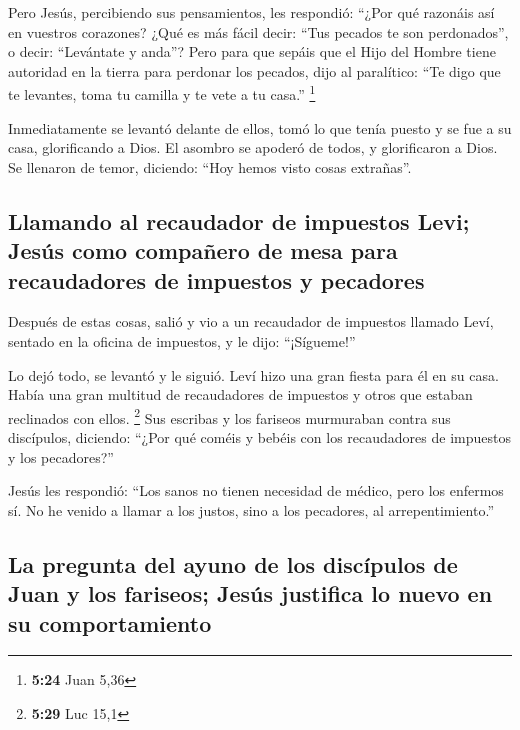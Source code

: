 \begin{paracol}{2}
 Pero Jesús, percibiendo sus pensamientos, les respondió:
``¿Por qué razonáis así en vuestros corazones?  ¿Qué es
más fácil decir: ``Tus pecados te son perdonados'', o decir: ``Levántate
y anda''?  Pero para que sepáis que el Hijo del Hombre
tiene autoridad en la tierra para perdonar los pecados, dijo al
paralítico: ``Te digo que te levantes, toma tu camilla y te vete a tu
casa.'' \footnote{\textbf{5:24} Juan 5,36}

 Inmediatamente se levantó delante de ellos, tomó lo que
tenía puesto y se fue a su casa, glorificando a Dios.  El
asombro se apoderó de todos, y glorificaron a Dios. Se llenaron de
temor, diciendo: ``Hoy hemos visto cosas extrañas''.

\hypertarget{llamando-al-recaudador-de-impuestos-levi-jesuxfas-como-compauxf1ero-de-mesa-para-recaudadores-de-impuestos-y-pecadores}{%
\subsection{Llamando al recaudador de impuestos Levi; Jesús como
compañero de mesa para recaudadores de impuestos y
pecadores}\label{llamando-al-recaudador-de-impuestos-levi-jesuxfas-como-compauxf1ero-de-mesa-para-recaudadores-de-impuestos-y-pecadores}}

 Después de estas cosas, salió y vio a un recaudador de
impuestos llamado Leví, sentado en la oficina de impuestos, y le dijo:
``¡Sígueme!''

 Lo dejó todo, se levantó y le siguió. 
Leví hizo una gran fiesta para él en su casa. Había una gran multitud de
recaudadores de impuestos y otros que estaban reclinados con ellos.
\footnote{\textbf{5:29} Luc 15,1}  Sus escribas y los
fariseos murmuraban contra sus discípulos, diciendo: ``¿Por qué coméis y
bebéis con los recaudadores de impuestos y los pecadores?''

 Jesús les respondió: ``Los sanos no tienen necesidad de
médico, pero los enfermos sí.  No he venido a llamar a
los justos, sino a los pecadores, al arrepentimiento.''

\hypertarget{la-pregunta-del-ayuno-de-los-discuxedpulos-de-juan-y-los-fariseos-jesuxfas-justifica-lo-nuevo-en-su-comportamiento}{%
\subsection{La pregunta del ayuno de los discípulos de Juan y los
fariseos; Jesús justifica lo nuevo en su
comportamiento}\label{la-pregunta-del-ayuno-de-los-discuxedpulos-de-juan-y-los-fariseos-jesuxfas-justifica-lo-nuevo-en-su-comportamiento}}


\end{paracol}
